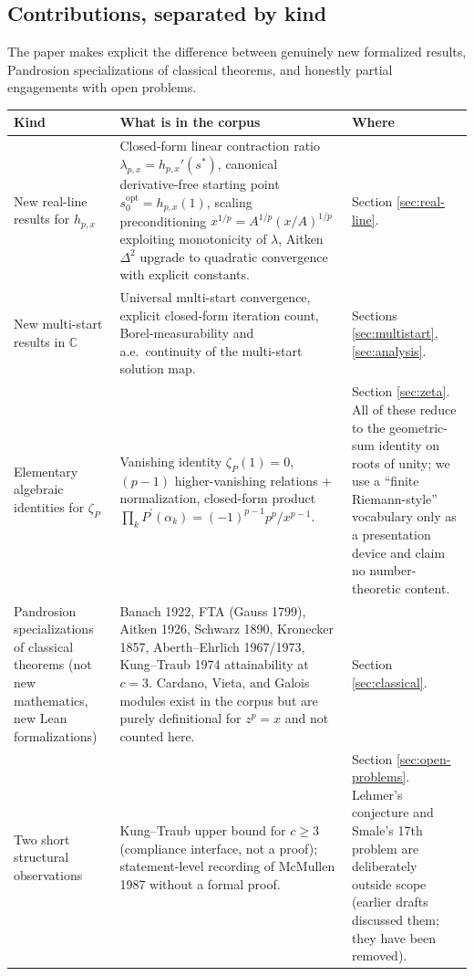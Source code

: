 \documentclass[11pt,a4paper]{article}
\theoremstyle{definition}
\theoremstyle{remark}
\begin{document}
\subsection{Contributions, separated by kind}
\label{sec:contrib-kinds}

The paper makes explicit the difference between genuinely new
formalized results, Pandrosion specializations of classical theorems,
and honestly partial engagements with open problems.

\begin{center}
\small
\begin{tabular}{@{}p{}p{}p{}@{}}
\toprule
\textbf{Kind} & \textbf{What is in the corpus} & \textbf{Where} \\
\midrule
New real-line results for $h_{p,x}$ & Closed-form linear contraction
 ratio $\lambda_{p,x} = h_{p,x}'(s^\ast)$, canonical
 derivative-free starting point $s_0^{\mathrm{opt}} = h_{p,x}(1)$,
 scaling preconditioning $x^{1/p} = A^{1/p}(x/A)^{1/p}$ exploiting
 monotonicity of $\lambda$, Aitken $\Delta^2$ upgrade to quadratic
 convergence with explicit constants.
 & Section \ref{sec:real-line}. \\
New multi-start results in $\mathbb{C}$ & Universal multi-start
 convergence, explicit closed-form iteration count, Borel-measurability
 and a.e.\ continuity of the multi-start solution map.
 & Sections \ref{sec:multistart}, \ref{sec:analysis}. \\
Elementary algebraic identities for $\zeta_P$ & Vanishing identity $\zeta_P(1) = 0$,
 $(p-1)$ higher-vanishing relations + normalization, closed-form product
 $\prod_k P^{\prime}(\alpha_k) = (-1)^{p-1} p^p/x^{p-1}$.
 & Section \ref{sec:zeta}. All of these reduce to the geometric-sum
 identity on roots of unity; we use a ``finite Riemann-style'' vocabulary
 only as a presentation device and claim no number-theoretic content. \\
Pandrosion specializations of classical theorems (not new
 mathematics, new Lean formalizations) & Banach 1922, FTA (Gauss 1799),
 Aitken 1926, Schwarz 1890, Kronecker 1857, Aberth--Ehrlich 1967/1973,
 Kung--Traub 1974 attainability at $c=3$. Cardano, Vieta, and Galois
 modules exist in the corpus but are purely definitional for $z^p=x$
 and not counted here.
 & Section \ref{sec:classical}. \\
Two short structural observations
 & Kung--Traub upper bound for $c \geq 3$ (compliance interface, not a
 proof); statement-level recording of McMullen 1987 without a formal
 proof.
 & Section \ref{sec:open-problems}. Lehmer's conjecture and Smale's
 17th problem are deliberately outside scope (earlier drafts discussed
 them; they have been removed). \\
\bottomrule
\end{tabular}
\end{center}
\end{document}
